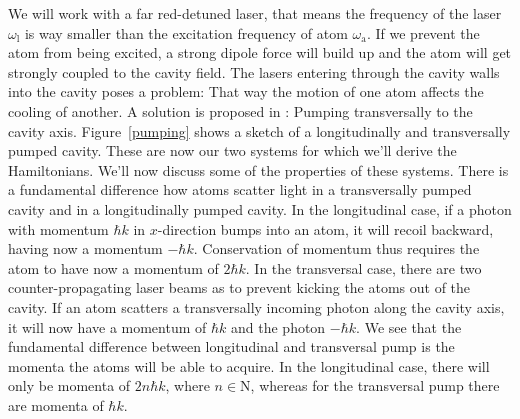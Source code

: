 \noindent We will work with a far red-detuned laser, that means the frequency of the laser $\omega_\text{l}$ is way smaller than the excitation frequency of atom $\omega_\text{a}$. If we prevent the atom from being excited, a strong dipole force will build up and the atom will get strongly coupled to the cavity field. The lasers entering through the cavity walls into the cavity poses a problem: That way the motion of one atom affects the cooling of another. A solution is proposed in \cite{domokos2002}: Pumping transversally to the cavity axis. Figure~\ref{pumping} shows a sketch of a longitudinally and transversally pumped cavity. These are now our two systems for which we'll derive the Hamiltonians. We'll now discuss some of the properties of these systems. There is a fundamental difference how atoms scatter light in a transversally pumped cavity and in a longitudinally pumped cavity. In the longitudinal case, if a photon with momentum $\hbar k$ in $x$-direction bumps into an atom, it will recoil backward, having now a momentum $-\hbar k$. Conservation of momentum thus requires the atom to have now a momentum of $2\hbar k$. In the transversal case, there are two counter-propagating laser beams as to prevent kicking the atoms out of the cavity. If an atom scatters a transversally incoming photon along the cavity axis, it will now have a momentum of $\hbar k$ and the photon $-\hbar k$. We see that the fundamental difference between longitudinal and transversal pump is the momenta the atoms will be able to acquire. In the longitudinal case, there will only be momenta of $2n\hbar k$, where $n \in \mathrm{N}$, whereas for the transversal pump there are momenta of $\hbar k$.

